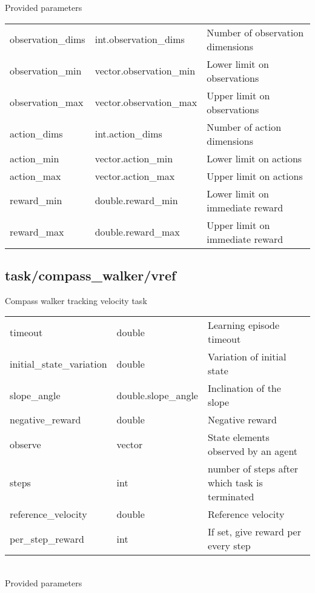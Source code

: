 \noindent Provided parameters\\

\noindent\begin{tabular}{@{}lll@{}}
observation\_dims&int.observation\_dims&Number of observation dimensions\\
observation\_min&vector.observation\_min&Lower limit on observations\\
observation\_max&vector.observation\_max&Upper limit on observations\\
action\_dims&int.action\_dims&Number of action dimensions\\
action\_min&vector.action\_min&Lower limit on actions\\
action\_max&vector.action\_max&Upper limit on actions\\
reward\_min&double.reward\_min&Lower limit on immediate reward\\
reward\_max&double.reward\_max&Upper limit on immediate reward\\
\end{tabular}
\subsection{task/compass\_walker/vref}
\noindent Compass walker tracking velocity task\\

\noindent\begin{tabular}{@{}lll@{}}
timeout&double&Learning episode timeout\\
initial\_state\_variation&double&Variation of initial state\\
slope\_angle&double.slope\_angle&Inclination of the slope\\
negative\_reward&double&Negative reward\\
observe&vector&State elements observed by an agent\\
steps&int&number of steps after which task is terminated\\
reference\_velocity&double&Reference velocity\\
per\_step\_reward&int&If set, give reward per every step\\
\end{tabular}
\\

\noindent Provided parameters\\

